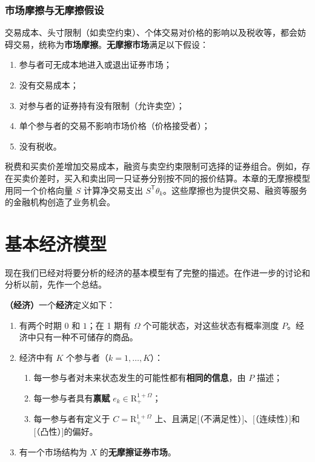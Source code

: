 \subsubsection{市场摩擦与无摩擦假设}
\begin{tcolorbox}[knowledge,title=市场摩擦与无摩擦假设]
交易成本、头寸限制（如卖空约束）、个体交易对价格的影响以及税收等，都会妨碍交易，统称为\textbf{市场摩擦}。\textbf{无摩擦市场}满足以下假设：
    \begin{enumerate}
        \item 参与者可无成本地进入或退出证券市场；
        \item 没有交易成本；
        \item 对参与者的证券持有没有限制（允许卖空）；
        \item 单个参与者的交易不影响市场价格（价格接受者）；
        \item 没有税收。
    \end{enumerate}
\end{tcolorbox}

税费和买卖价差增加交易成本，融资与卖空约束限制可选择的证券组合。例如，存在买卖价差时，买入和卖出同一只证券分别按不同的报价结算。本章的无摩擦模型用同一个价格向量 $S$ 计算净交易支出 $S^{\mathsf T}\theta_k$。这些摩擦也为提供交易、融资等服务的金融机构创造了业务机会。
\section{基本经济模型}

现在我们已经对将要分析的经济的基本模型有了完整的描述。在作进一步的讨论和分析以前，先作一个总结。

\begin{tcolorbox}[knowledge]
\textbf{（经济）}\quad 一个\textbf{经济}定义如下：
\begin{enumerate}
    \item 有两个时期 $0$ 和 $1$；在 1 期有 $\Omega$ 个可能状态，对这些状态有概率测度 $P$。经济中只有一种不可储存的商品。
    \item 经济中有 $K$ 个参与者（$k=1,\dots,K$）：
    \begin{enumerate}[label=(\alph*)]
        \item 每一参与者对未来状态发生的可能性都有\textbf{相同的信息}，由 $P$ 描述；
        \item 每一参与者具有\textbf{禀赋} $e_k\in\mathrm{R}^{1+\Omega}_{+}$；
        \item 每一参与者有定义于 $C=\mathrm{R}^{1+\Omega}_{+}$ 上、且满足[（不满足性）]、[（连续性）]和[（凸性）]的偏好。
    \end{enumerate}
    \item 有一个市场结构为 $X$ 的\textbf{无摩擦证券市场}。
\end{enumerate}
\end{tcolorbox}

